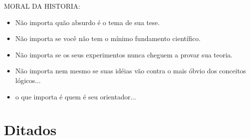 MORAL DA HISTORIA:

\begin{itemize}
\item Não importa quão absurdo é o tema de sua tese.
\item Não importa se você não tem o mínimo fundamento científico.
\item Não importa se os seus experimentos nunca cheguem a provar sua teoria.
\item Não importa nem mesmo se suas idéias vão contra o mais óbvio dos conceitos lógicos...
\item o que importa é quem é seu orientador...
\end{itemize}

\section{Ditados}
